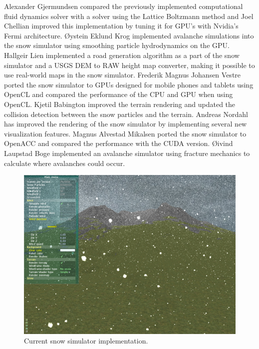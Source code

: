Alexander Gjermundsen\cite{lbmWind} compared the previously implemented
computational fluid dynamics solver with a solver using the Lattice Boltzmann
method and Joel Chellian\cite{fermi} improved this implementation by tuning it
for GPU's with Nvidia's Fermi architecture. Øystein Eklund Krog\cite{avalanche1}
implemented avalanche simulations into the snow simulator using smoothing
particle hydrodynamics on the GPU. Hallgeir Lien\cite{road} implemented a road
generation algorithm as a part of the snow simulator and a USGS DEM to RAW
height map converter, making it possible to use real-world maps in the snow
simulator. Frederik Magnus Johansen Vestre\cite{openclSnowThesis} ported the
snow simulator to GPUs designed for mobile phones and tablets using OpenCL and
compared the performance of the CPU and GPU when using OpenCL. Kjetil
Babington\cite{snowTerrainThesis} improved the terrain rendering and updated the
collision detection between the snow particles and the terrain. Andreas
Nordahl\cite{realisticSnowTerrainThesis} has improved the rendering of the snow
simulator by implementing several new visualization features. Magnus Alvestad
Mikalsen\cite{openAccThesis} ported the snow simulator to OpenACC and compared
the performance with the CUDA version. Øivind Laupstad Boge\cite{avalanche2}
implemented an avalanche simulator using fracture mechanics to calculate where
avalanches could occur.

\begin{figure}[ht]
	\center
	\includegraphics[width=1.0\textwidth]{images/snow/gpu/snow7}
	\caption{Current snow simulator implementation.}
	\label{fig:gpuSnow}
\end{figure}

